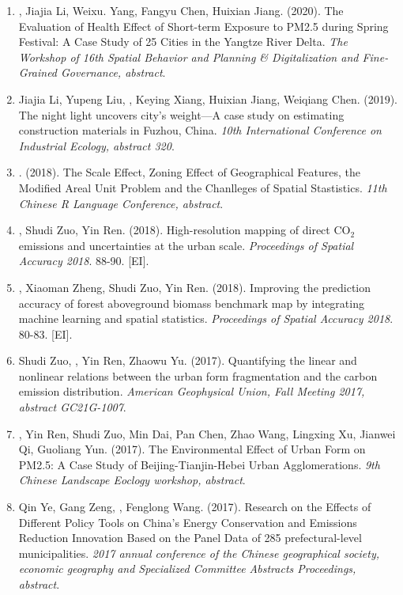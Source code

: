 \begin{enumerate}
\item
    \Shaoqing, Jiajia Li, Weixu. Yang, Fangyu Chen, Huixian Jiang. (2020).
    The Evaluation of Health Effect of Short-term Exposure to PM2.5 during Spring Festival: A Case Study of 25 Cities in the Yangtze River Delta.
    \textit{The Workshop of 16th Spatial Behavior and Planning \& Digitalization and Fine-Grained Governance, abstract}.
\item
    Jiajia Li, Yupeng Liu, \Shaoqing, Keying Xiang, Huixian Jiang, Weiqiang Chen. (2019).
    The night light uncovers city’s weight—A case study on estimating construction materials in Fuzhou, China.
    \textit{10th International Conference on Industrial Ecology, abstract 320}.
\item
    \Shaoqing. (2018).
    The Scale Effect, Zoning Effect of Geographical Features, the Modified Areal Unit Problem and the Chanlleges of Spatial Stastistics.
    \textit{11th Chinese R Language Conference, abstract}.
\item
    \Shaoqing, Shudi Zuo, Yin Ren. (2018).
    High-resolution mapping of direct CO$_2$ emissions and uncertainties at the urban scale.
    \textit{Proceedings of Spatial Accuracy 2018}. 88-90. [EI].
\item
    \Shaoqing\CF, Xiaoman Zheng, Shudi Zuo, Yin Ren. (2018).
    Improving the prediction accuracy of forest aboveground biomass benchmark map by integrating machine learning and spatial statistics.
    \textit{Proceedings of Spatial Accuracy 2018}. 80-83. [EI].
\item
    Shudi Zuo, \Shaoqing, Yin Ren, Zhaowu Yu. (2017).
    Quantifying the linear and nonlinear relations between the urban form fragmentation and the carbon emission distribution.
    \textit{American Geophysical Union, Fall Meeting 2017, abstract GC21G-1007}.
\item
    \Shaoqing, Yin Ren, Shudi Zuo, Min Dai, Pan Chen, Zhao Wang, Lingxing Xu, Jianwei Qi, Guoliang Yun. (2017).
    The Environmental Effect of Urban Form on PM2.5: A Case Study of Beijing-Tianjin-Hebei Urban Agglomerations.
    \textit{9th Chinese Landscape Eoclogy workshop, abstract}.
\item
    Qin Ye, Gang Zeng, \Shaoqing, Fenglong Wang. (2017).
    Research on the Effects of Different Policy Tools on China’s Energy Conservation and Emissions Reduction Innovation Based on the Panel Data of 285 prefectural-level municipalities.
    \textit{2017 annual conference of the Chinese geographical society, economic geography and Specialized Committee Abstracts Proceedings, abstract}.

\end{enumerate}
